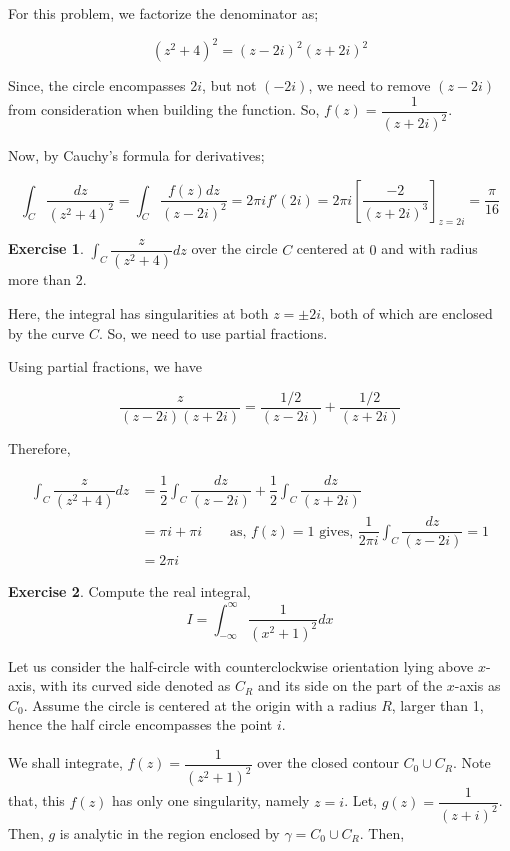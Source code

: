 \documentclass[12pt]{article}
\theoremstyle{definition}
\newtheorem{ex}{Exercise}
\newenvironment{exercise}{
\begin{tcolorbox}[colback=red!5!white,colframe=red!75!black, parbox = false]\begin{ex} }{\end{ex}\end{tcolorbox} }
\begin{document}
For this problem, we factorize the denominator as;

$$
(z^2 + 4)^2 = (z - 2i)^2 (z + 2i)^2
$$

Since, the circle encompasses $2i$, but not $(-2i)$, we need to remove $(z - 2i)$ from consideration when building the function. So, $f(z) = \dfrac{1}{(z + 2i)^2}$. 

Now, by Cauchy's formula for derivatives;

$$
\int_{C} \dfrac{dz}{(z^2 + 4)^2} = \int_C \dfrac{f(z)dz}{(z - 2i)^2} = 2\pi i f'(2i) = 2\pi i \left[ \dfrac{-2}{(z + 2i)^3} \right]_{z = 2i} = \dfrac{\pi}{16}
$$

\begin{exercise}
    $\int_C \dfrac{z}{(z^2 + 4)}dz$ over the circle $C$ centered at $0$ and with radius more than $2$.
\end{exercise}

Here, the integral has singularities at both $z = \pm 2i$, both of which are enclosed by the curve $C$. So, we need to use partial fractions.

Using partial fractions, we have 

$$\dfrac{z}{(z - 2i)(z + 2i)} = \dfrac{1/2}{(z - 2i)} + \dfrac{1/2}{(z + 2i)}$$

Therefore,

\begin{align*}
    \int_C \dfrac{z}{(z^2+ 4)}dz
    & = \dfrac{1}{2} \int_C \dfrac{dz}{(z - 2i)} + \dfrac{1}{2} \int_C \dfrac{dz}{(z + 2i)}\\
    & = \pi i + \pi i \qquad \text{as, } f(z) = 1 \text{ gives, } \dfrac{1}{2\pi i} \int_C \dfrac{dz}{(z - 2i)} = 1\\
    & = 2\pi i
\end{align*}


\begin{exercise}
    Compute the real integral,
    $$I = \int_{-\infty}^{\infty} \dfrac{1}{(x^2 + 1)^2} dx$$
\end{exercise}

Let us consider the half-circle with counterclockwise orientation lying above $x$-axis, with its curved side denoted as $C_R$ and its side on the part of the $x$-axis as $C_0$. Assume the circle is centered at the origin with a radius $R$, larger than 1, hence the half circle encompasses the point $i$.

We shall integrate, $f(z) = \dfrac{1}{(z^2 + 1)^2}$ over the closed contour $C_0 \cup C_R$. Note that, this $f(z)$ has only one singularity, namely $z = i$. Let, $g(z) = \dfrac{1}{(z + i)^2}$. Then, $g$ is analytic in the region enclosed by $\gamma = C_0 \cup C_R$. Then,
\end{document}
